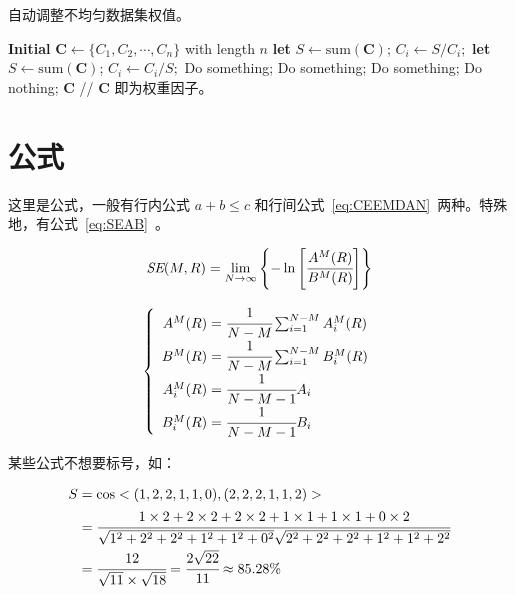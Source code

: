 \documentclass[14pt]{jnuthesis}
\begin{document}
\begin{algorithm}[H]
	\caption{自动调整不均匀数据集权值。}
	\begin{algorithmic}[1]
		\State \textbf{Initial } $\bm{C} \gets \{C_1, C_2, \cdots, C_n\}$ with length $n$
		\State \textbf{let } $S \gets \mathrm{sum}(\bm{C})$;
			\State $C_i \gets S / C_i;$
		\EndFor
		\State \textbf{let } $S \gets \mathrm{sum}(\bm{C})$;
			\State $C_i \gets C_i / S;$
		\EndFor
			\State Do something;
			\State Do something;
			\State Do something;
		\Else
			\State Do nothing;
		\EndIf
		\State \Return $\bm{C}$ // $\bm{C}$ 即为权重因子。 
	\end{algorithmic}
	\label{alg:1}
\end{algorithm}

\section{公式}

这里是公式，一般有行内公式 $a + b \leqslant c$ 和行间公式~\eqref{eq:CEEMDAN}~两种。特殊地，有公式~\eqref{eq:SEAB}~。

\begin{equation}
	\textit{SE}(M, R) = \mathop{\lim}_{N \to \infty}\left\{-\ln\left[\cfrac{A^M(R)}{B^M(R)}\right]\right\}
	\label{eq:SE}
\end{equation}

\begin{equation}
	\begin{aligned}
		\left\{\begin{array}{r@{{}={}}l}
			A^M(R) & \cfrac{1}{N - M}\mathop{\sum}_{i = 1}^{N - M}A_i^M(R)  \\
			B^M(R) & \cfrac{1}{N - M}\mathop{\sum}_{i = 1}^{N - M}B_i^M(R)  \\
			A_i^M(R) & \cfrac{1}{N - M - 1}A_i  \\
			B_i^M(R) & \cfrac{1}{N - M - 1}B_i
		\end{array}
		\right.
	\end{aligned}
	\label{eq:SEAB}
\end{equation}

某些公式不想要标号，如：

\begin{equation*}
	\begin{aligned}
		S & = \cos<(1, 2, 2, 1, 1, 0), (2, 2, 2, 1, 1, 2)>  \\
		 & = \cfrac{1 \times 2 + 2 \times 2 + 2 \times 2 + 1 \times 1 + 1 \times 1 + 0 \times 2}{\sqrt{1^2 + 2^2 + 2^2 + 1^2 + 1^2 + 0^2}\sqrt{2^2 + 2^2 + 2^2 + 1^2 + 1^2 + 2^2}}  \\
		 & = \cfrac{12}{\sqrt{11} \times \sqrt{18}} = \cfrac{2\sqrt{22}}{11} \approx 85.28\%
	\end{aligned}
\end{equation*}
\end{document}
